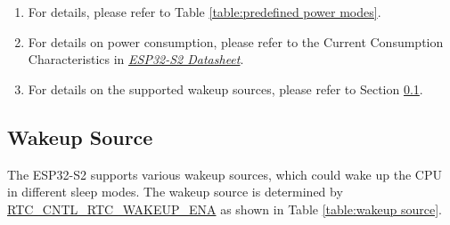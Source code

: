 \documentclass[main\_\_EN.tex]{subfiles}
\begin{document}
\begin{tiplisting}
\vspace{-2em}
\label{predefined-modes-notes}
\begin{enumerate}
    \item For details, please refer to Table \ref{table:predefined power modes}.
    \item For details on power consumption, please refer to the Current Consumption Characteristics in \href{https://www.espressif.com/sites/default/files/documentation/esp32-s2_datasheet_en.pdf}{\it{ESP32-S2 Datasheet}}.
    \item For details on the supported wakeup sources, please refer to Section \ref{WakeupSource}.
\end{enumerate}
\end{tiplisting}


\subsection{Wakeup Source}\label{WakeupSource}

The ESP32-S2 supports various wakeup sources, which could wake up the CPU in different sleep modes. The wakeup source is determined by \hyperref[fielddesc:RTCCNTLRTCWAKEUPENA]{RTC\_CNTL\_RTC\_WAKEUP\_ENA} as shown in Table \ref{table:wakeup source}.
\end{document}
